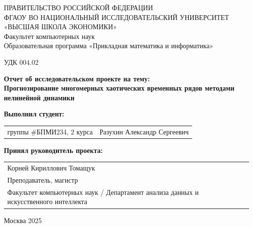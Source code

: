 \documentclass[a4paper, 12pt]{extarticle}
\begin{document}
{
\begin{center}
ПРАВИТЕЛЬСТВО РОССИЙСКОЙ ФЕДЕРАЦИИ\\
ФГАОУ ВО НАЦИОНАЛЬНЫЙ ИССЛЕДОВАТЕЛЬСКИЙ УНИВЕРСИТЕТ\\
«ВЫСШАЯ ШКОЛА ЭКОНОМИКИ»
\\
\bigskip
Факультет компьютерных наук\\
Образовательная программа «Прикладная математика и информатика»
\end{center}
}

\vspace{2em}
УДК 004.02
\vspace{4em}

\begin{center}
    {\bf Отчет об исследовательском проекте на тему:}\\
    {\bf Прогнозирование многомерных хаотических временных рядов методами нелинейной динамики}\\
\end{center}
    
\vspace{2em}
    
{\bf Выполнил студент: \vspace{2mm}}
    
{
\begin{tabular}{l@{\hskip 1.5cm}l}
    группы \#БПМИ234, 2 курса & Разухин Александр Сергеевич \\
\end{tabular}}


\vspace{1em}
{\bf Принял руководитель проекта: \vspace{2mm}}
    
{
\begin{tabular}{l}
    Корней Кириллович Томащук\\
    Преподаватель, магистр\\
    Факультет компьютерных наук / Департамент анализа данных и искусственного интеллекта
\end{tabular}}

\vspace{\fill}

\begin{center}
Москва 2025
\end{center}

\newpage

\tableofcontents
\end{document}
